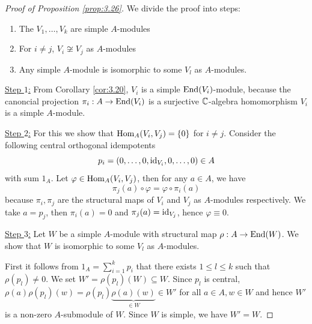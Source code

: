 \documentclass[twoside = false,	%
		headsepline,		%
		parskip = true,
		]{scrbook}						%
\begin{document}
        \begin{proof}[Proof of Proposition \ref{prop:3.26}]
            We divide the proof into steps:
            \begin{enumerate}
                \item The $V_1,\dots,V_k$ are simple $A$-modules
                \item For $i \neq j$, $V_i \not \cong V_j$ as $A$-modules
                \item Any simple $A$-module is isomorphic to some $V_l$ as $A$-modules.
            \end{enumerate}
            \underline{Step $1$:} From Corollary \ref{cor:3.20}, $V_i$ is a simple $\mathrm{End}(V_i)$-module, because the canoncial projection $\pi_i:A \to \mathrm{End}(V_i)$ is a surjective $\mathbb C$-algebra homomorphism $V_i$ is a simple $A$-module.

            \underline{Step $2$:} For this we show that $\mathrm{Hom}_A(V_i,V_j) = \{0\}$ for $i \neq j$. Consider the following central orthogonal idempotents
            \begin{equation*}
                p_i = (0,\dots,0,\mathrm{id}_{V_i},0,\dots,0) \in A
            \end{equation*}
            with sum $1_A$. Let $\varphi \in \mathrm{Hom}_A(V_i,V_j)$, then for any $a \in A$, we have
            \begin{equation*}
                \pi_j(a) \circ \varphi = \varphi \circ \pi_i(a)
            \end{equation*}
            because $\pi_i,\pi_j$ are the structural maps of $V_i$ and $V_j$ as $A$-modules respectively. We take $a = p_j$, then $\pi_i(a) = 0$ and $\pi_j(a) = \mathrm{id}_{V_j}$, hence $\varphi \equiv 0$.

            \underline{Step $3$:} Let $W$ be a simple $A$-module with structural map $\rho: A \to \mathrm{End}(W)$. We show that $W$ is isomorphic to some $V_l$ as $A$-modules.

            First it follows from $1_A = \sum_{i=1}^k p_i$ that there exists $1 \leq l \leq k$ such that $\rho(p_l) \neq 0$. We set $W' = \rho(p_l)(W) \subseteq W$. Since $p_l$ is central, $\rho(a)\rho(p_l)(w) = \rho(p_l) \underbrace{\rho(a)(w)}_{\in W} \in W'$ for all $a \in A, w \in W$ and hence $W'$ is a non-zero $A$-submodule of $W$. Since $W$ is simple, we have $W' = W$.


\end{proof}
\end{document}
